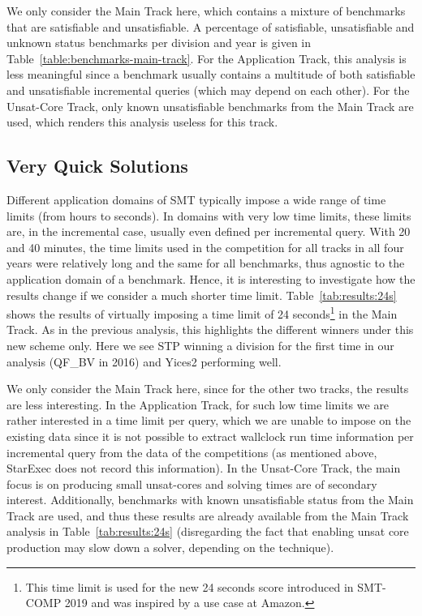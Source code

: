 \documentclass[dvipsnames,table,twoside,11pt]{article}
\newcommand{\maintrack}{Main Track\xspace}
\newcommand{\apptrack}{Application Track\xspace}
\newcommand{\ucoretrack}{Unsat-Core Track\xspace}
\begin{document}
We only consider the \maintrack here, which contains a mixture of benchmarks that
are satisfiable and unsatisfiable. A percentage of satisfiable, unsatisfiable
and unknown status benchmarks per division and year is given in
Table~\ref{table:benchmarks-main-track}.  For the \apptrack, this analysis is
less meaningful since a benchmark usually contains a multitude of both
satisfiable and unsatisfiable incremental queries
(which may depend on each other).
For the \ucoretrack, only known unsatisfiable benchmarks from the \maintrack
are used, which renders this analysis useless for this track.





\subsection{Very Quick Solutions}

Different application domains of SMT typically impose a wide range of time
limits (from hours to seconds). In domains with very low time limits, these
limits are, in the incremental case, usually even defined per incremental
query.  With 20 and 40 minutes, the time limits used in the competition for all
tracks in all four years were relatively long and the same for all benchmarks,
thus agnostic to the application domain of a benchmark.  Hence, it is
interesting to investigate how the results change if we consider a much shorter
time limit.  Table~\ref{tab:results:24s} shows the results of virtually
imposing a time limit of 24 seconds\footnote{This time limit is used for the
new 24 seconds score introduced in SMT-COMP 2019 and was inspired by a use case
at Amazon.} in the \maintrack.  As in the previous analysis, this highlights the
different winners under this new scheme only. Here we see STP winning a
division for the first time in our analysis (QF\_BV in 2016) and Yices2
performing well.

We only consider the \maintrack here, since for the other two tracks, the
results are less interesting.  In the \apptrack, for such low time limits we
are rather interested in a time limit per query, which we are unable to impose
on the existing data since it is not possible to extract wallclock run time
information per incremental query from the data of the competitions (as
mentioned above, StarExec does not record this information).  In the
\ucoretrack, the main focus is on producing small unsat-cores and solving times
are of secondary interest.  Additionally, benchmarks with known unsatisfiable
status from the \maintrack are used, and thus these results are already
available from the \maintrack analysis in Table~\ref{tab:results:24s}
(disregarding the fact that enabling unsat core production may slow down a
solver, depending on the technique).
\end{document}
